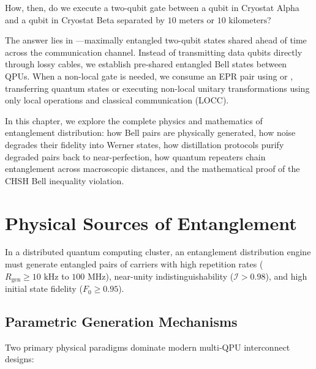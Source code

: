 How, then, do we execute a two-qubit gate between a qubit in Cryostat Alpha and a qubit in Cryostat Beta separated by $10\text{ meters}$ or $10\text{ kilometers}$?

The answer lies in ---maximally entangled two-qubit states shared ahead of time across the communication channel. Instead of transmitting data qubits directly through lossy cables, we establish pre-shared entangled Bell states between QPUs. When a non-local gate is needed, we consume an EPR pair using  or , transferring quantum states or executing non-local unitary transformations using only local operations and classical communication (LOCC).

In this chapter, we explore the complete physics and mathematics of entanglement distribution: how Bell pairs are physically generated, how noise degrades their fidelity into Werner states, how distillation protocols purify degraded pairs back to near-perfection, how quantum repeaters chain entanglement across macroscopic distances, and the mathematical proof of the CHSH Bell inequality violation.

\section{Physical Sources of Entanglement}
\label{sec:epr_sources}

In a distributed quantum computing cluster, an entanglement distribution engine must generate entangled pairs of carriers with high repetition rates ($R_{\text{gen}} \ge 10\text{ kHz}$ to $100\text{ MHz}$), near-unity indistinguishability ($\mathcal{I} > 0.98$), and high initial state fidelity ($F_0 \ge 0.95$).

\subsection{Parametric Generation Mechanisms}
Two primary physical paradigms dominate modern multi-QPU interconnect designs:

